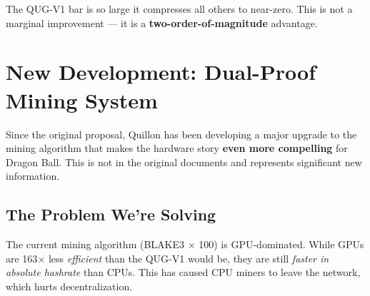 \documentclass[11pt,a4paper]{article}
\begin{document}
\begin{center}
\end{center}

The QUG-V1 bar is so large it compresses all others to near-zero. This is not a marginal improvement --- it is a \textbf{two-order-of-magnitude} advantage.


\section{New Development: Dual-Proof Mining System}
\label{sec:dual-proof}

Since the original proposal, Quillon has been developing a major upgrade to the mining algorithm that makes the hardware story \textbf{even more compelling} for Dragon Ball. This is not in the original documents and represents significant new information.

\subsection{The Problem We're Solving}

The current mining algorithm (BLAKE3 $\times$ 100) is GPU-dominated. While GPUs are 163$\times$ less \textit{efficient} than the QUG-V1 would be, they are still \textit{faster in absolute hashrate} than CPUs. This has caused CPU miners to leave the network, which hurts decentralization.
\end{document}
